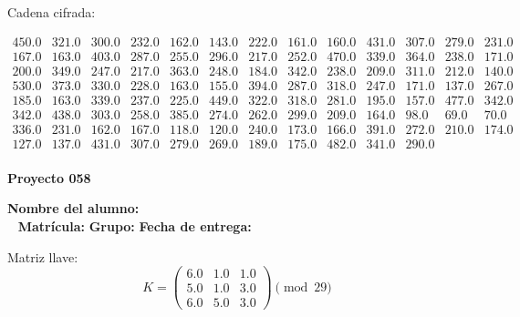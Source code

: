 \documentclass[12pt]{article}
\begin{document}
Cadena cifrada:
\begin{center}
$\begin{array}{lllllllllllll}
450.0 & 321.0 & 300.0 & 232.0 & 162.0 & 143.0 & 222.0 & 161.0 & 160.0 & 431.0 & 307.0 & 279.0 & 231.0\\
167.0 & 163.0 & 403.0 & 287.0 & 255.0 & 296.0 & 217.0 & 252.0 & 470.0 & 339.0 & 364.0 & 238.0 & 171.0\\
200.0 & 349.0 & 247.0 & 217.0 & 363.0 & 248.0 & 184.0 & 342.0 & 238.0 & 209.0 & 311.0 & 212.0 & 140.0\\
530.0 & 373.0 & 330.0 & 228.0 & 163.0 & 155.0 & 394.0 & 287.0 & 318.0 & 247.0 & 171.0 & 137.0 & 267.0\\
185.0 & 163.0 & 339.0 & 237.0 & 225.0 & 449.0 & 322.0 & 318.0 & 281.0 & 195.0 & 157.0 & 477.0 & 342.0\\
342.0 & 438.0 & 303.0 & 258.0 & 385.0 & 274.0 & 262.0 & 299.0 & 209.0 & 164.0 & 98.0 & 69.0 & 70.0\\
336.0 & 231.0 & 162.0 & 167.0 & 118.0 & 120.0 & 240.0 & 173.0 & 166.0 & 391.0 & 272.0 & 210.0 & 174.0\\
127.0 & 137.0 & 431.0 & 307.0 & 279.0 & 269.0 & 189.0 & 175.0 & 482.0 & 341.0 & 290.0\\
\end{array}$
\end{center}

\newpage


\textbf{Proyecto 058}

\textbf{Nombre del alumno:} \underline{\hspace{13cm}}\\\
\vspace{1cm}
\textbf{Matrícula:} \underline{\hspace{4cm}} \hspace{1cm}
\textbf{Grupo:} \underline{\hspace{2cm}}
\textbf{Fecha de entrega:} \underline{\hspace{2cm}}

\medskip

Matriz llave:
\[
K = \begin{pmatrix}
6.0 & 1.0 & 1.0\\
5.0 & 1.0 & 3.0\\
6.0 & 5.0 & 3.0
\end{pmatrix} \pmod{29}
\]
\end{document}
